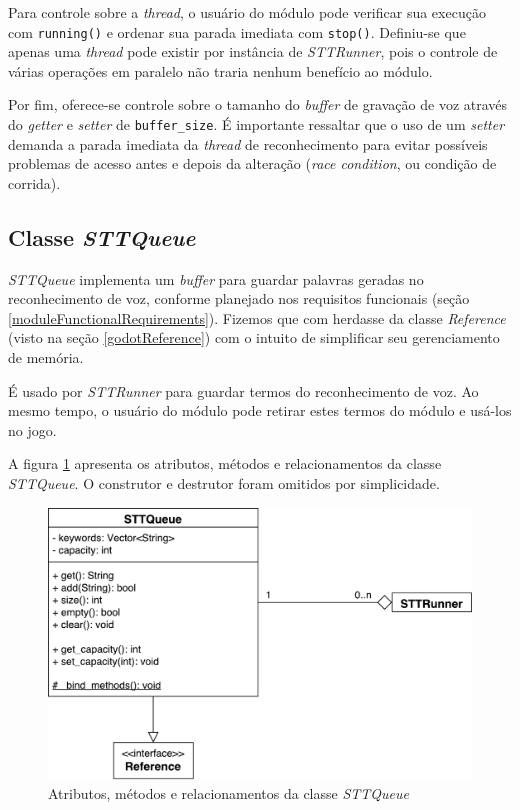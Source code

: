 Para controle sobre a \textit{thread}, o usuário do módulo pode verificar sua execução com \texttt{running()} e ordenar sua parada imediata com \texttt{stop()}. Definiu-se que apenas uma \textit{thread} pode existir por instância de \textit{STTRunner}, pois o controle de várias operações em paralelo não traria nenhum benefício ao módulo.

Por fim, oferece-se controle sobre o tamanho do \textit{buffer} de gravação de voz através do \textit{getter} e \textit{setter} de \texttt{buffer\_size}. É importante ressaltar que o uso de um \textit{setter} demanda a parada imediata da \textit{thread} de reconhecimento para evitar possíveis problemas de acesso antes e depois da alteração (\textit{race condition}, ou condição de corrida).


\subsection{Classe \textit{STTQueue}}
\label{stt-queue}

\textit{STTQueue} implementa um \textit{buffer} para guardar palavras geradas no reconhecimento de voz, conforme planejado nos requisitos funcionais (seção \ref{moduleFunctionalRequirements}). Fizemos que com herdasse da classe \textit{Reference} (visto na seção \ref{godotReference}) com o intuito de simplificar seu gerenciamento de memória.

É usado por \textit{STTRunner} para guardar termos do reconhecimento de voz. Ao mesmo tempo, o usuário do módulo pode retirar estes termos do módulo e usá-los no jogo.

A figura \ref{stt-queue-diagram} apresenta os atributos, métodos e relacionamentos da classe \textit{STTQueue}. O construtor e destrutor foram omitidos por simplicidade.

\begin{figure}[H]
  \centering
  \includegraphics[width=.8\textwidth]{image/stt-queue.pdf}
  \caption{Atributos, métodos e relacionamentos da classe \textit{STTQueue}}
  \label{stt-queue-diagram}
\end{figure}

